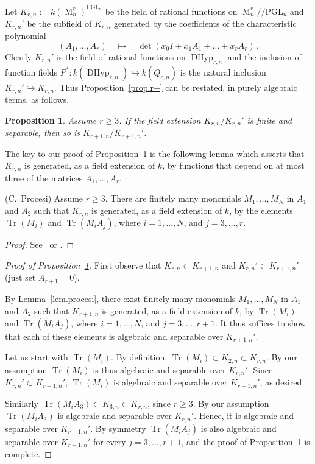 \documentclass[12pt]{amsart}
\numberwithin{equation}{section}
\numberwithin{subsection}{section}
\newtheorem{proposition}[theorem]{Proposition}
\theoremstyle{definition} \newtheorem{definition}[theorem]{Definition}
\newcommand\DHyp{\operatorname{DHyp}}
\newcommand{\PGL}{\mathrm{PGL}}
\newcommand{\tr}{\operatorname{Tr}}
\newcommand{\Tr}{\operatorname{Tr}}
\newcommand{\Mat}{\operatorname{M}}
\begin{document}
Let $K_{r, n}:= k(\Mat_n^r)^{\PGL_n}$ be the field of rational functions
on $\Mat_n^r/\! \!/\PGL_n$ and $K_{r, n}'$ be the subfield of $K_{r, n}$
generated by the coefficients of the characteristic polynomial
\[ (A_1, \dots, A_r) \quad \mapsto \quad 
\det(x_0 I + x_1 A_1 + \dots + x_r A_r) \, . \]
Clearly $K_{r, n}'$ is the field of rational functions on
$\DHyp_{r, n}$ and the inclusion of function fields 
$P^* \colon k(\DHyp_{r, n}) \hookrightarrow k(Q_{r, n})$ is 
the natural inclusion $K_{r, n}' \hookrightarrow K_{r, n}$.
Thus Proposition~\ref{prop.r+} can be restated, in purely 
algebraic terms, as follows.

\begin{proposition} \label{prop.r++} 
Assume $r \geqslant 3$. If the field extension $K_{r, n}/K_{r, n}'$ is 
finite and separable, then so is
$K_{r + 1, n}/K_{r+1, n}'$.  
\end{proposition}

The key to our proof of Proposition~\ref{prop.r++} is the following
lemma which asserts that $K_{r, n}$ is generated, as a field 
extension of $k$, by
functions that depend on at most three of the matrices $A_1, \dots, A_r$.

\begin{lemma} {\rm(}C.~Procesi{\rm)} \label{lem.procesi} 
Assume $r \geqslant 3$.  There are finitely many monomials
$M_1, \ldots, M_N$ in $A_1$ and $A_2$ such that $K_{r, n}$ is generated, 
as a field extension of $k$, by the elements
$\tr(M_i)$ and $\tr(M_i A_j)$, where $i = 1, \dots, N$, and $j = 3, \dots, r$.
\end{lemma}

\begin{proof} See~\cite[Proposition 2.3, p.~255]{procesi} 
or \cite[Theorem 3.2 and Example 3.3(a)]{fgg}.
\end{proof}

\begin{proof}[Proof of Proposition~\ref{prop.r++}]
First observe that $K_{r, n} \subset K_{r+1, n}$ and 
$K_{r, n}' \subset K_{r+1, n}'$ (just set $A_{r+1} = 0$).

By Lemma~\ref{lem.procesi}, there exist finitely many monomials
$M_1, \ldots, M_N$ in $A_1$ and $A_2$ such that $K_{r+1, n}$ is generated,
as a field extension of $k$, by $\tr(M_i)$ and $\tr(M_i A_j)$, 
where $i = 1, \dots, N$, and $j = 3, \dots, r + 1$.
It thus suffices to show that each of these elements
is algebraic and separable over $K_{r+1, n}'$. 

Let us start with $\tr(M_i)$. By definition, $\tr(M_i) \subset K_{2, n} 
\subset K_{r, n}$.  By our assumption 
$\Tr(M_i)$ is thus algebraic and separable over $K_{r, n}'$. Since 
$K_{r, n}' \subset K_{r+1, n}'$, $\Tr(M_i)$ is algebraic and separable
over $K_{r+1, n}'$, as desired.

Similarly $\tr(M_iA_3) \subset K_{3, n} \subset K_{r, n}$, since 
$r \geqslant 3$.
By our assumption $\tr(M_i A_3)$ is algebraic and separable
over $K_{r, n}'$. Hence, it is algebraic and separable over $K_{r+1, n}'$.
By symmetry $\tr(M_i A_j)$ is also algebraic and separable over 
$K_{r+1, n}'$ for every $j = 3, \dots, r+1$, and the proof of
Proposition~\ref{prop.r++} is complete.
\end{proof}
\end{document}
